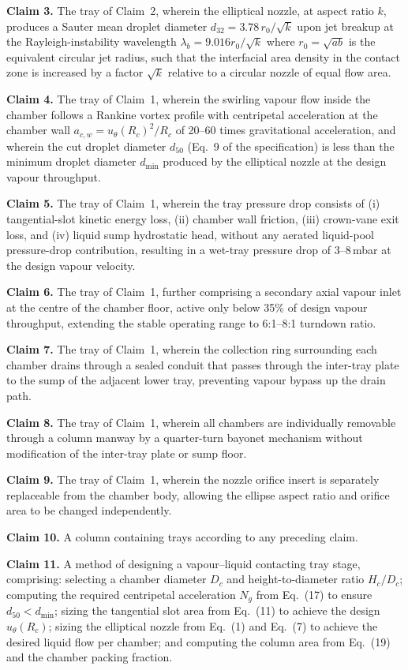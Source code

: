 \documentclass[11pt,letterpaper]{article}
\newcommand{\utheta}{u_{\theta}}
\newcommand{\Rc}{R_c}
\newcommand{\Hc}{H_c}
\newcommand{\Dc}{D_c}
\newcommand{\dsv}{d_{32}}
\newcommand{\dmin}{d_{\min}}
\newcommand{\dcut}{d_{50}}
\begin{document}
\textbf{Claim 3.}
The tray of Claim~2, wherein the elliptical nozzle, at aspect ratio $k$,
produces a Sauter mean droplet diameter $\dsv = 3.78\,r_0/\sqrt{k}$ upon
jet breakup at the Rayleigh-instability wavelength $\lambda_b = 9.016
r_0/\sqrt{k}$ where $r_0 = \sqrt{ab}$ is the equivalent circular jet
radius, such that the interfacial area density in the contact zone is
increased by a factor $\sqrt{k}$ relative to a circular nozzle of
equal flow area.

\textbf{Claim 4.}
The tray of Claim~1, wherein the swirling vapour flow inside the chamber
follows a Rankine vortex profile with centripetal acceleration at the
chamber wall $a_{c,w} = \utheta(\Rc)^2/\Rc$ of 20--60 times gravitational
acceleration, and wherein the cut droplet diameter $\dcut$ (Eq.~9 of the
specification) is less than the minimum droplet diameter $\dmin$ produced
by the elliptical nozzle at the design vapour throughput.

\textbf{Claim 5.}
The tray of Claim~1, wherein the tray pressure drop consists of
(i) tangential-slot kinetic energy loss, (ii) chamber wall friction,
(iii) crown-vane exit loss, and (iv) liquid sump hydrostatic head, without
any aerated liquid-pool pressure-drop contribution, resulting in a wet-tray
pressure drop of 3--8\,mbar at the design vapour velocity.

\textbf{Claim 6.}
The tray of Claim~1, further comprising a secondary axial vapour inlet at
the centre of the chamber floor, active only below 35\% of design vapour
throughput, extending the stable operating range to 6:1--8:1 turndown ratio.

\textbf{Claim 7.}
The tray of Claim~1, wherein the collection ring surrounding each chamber
drains through a sealed conduit that passes through the inter-tray plate to
the sump of the adjacent lower tray, preventing vapour bypass up the drain
path.

\textbf{Claim 8.}
The tray of Claim~1, wherein all chambers are individually removable through
a column manway by a quarter-turn bayonet mechanism without modification of
the inter-tray plate or sump floor.

\textbf{Claim 9.}
The tray of Claim~1, wherein the nozzle orifice insert is separately
replaceable from the chamber body, allowing the ellipse aspect ratio and
orifice area to be changed independently.

\textbf{Claim 10.}
A column containing trays according to any preceding claim.

\textbf{Claim 11.}
A method of designing a vapour--liquid contacting tray stage, comprising:
selecting a chamber diameter $\Dc$ and height-to-diameter ratio $\Hc/\Dc$;
computing the required centripetal acceleration $N_g$ from Eq.~(17) to
ensure $\dcut < \dmin$; sizing the tangential slot area from Eq.~(11) to
achieve the design $\utheta(\Rc)$; sizing the elliptical nozzle from
Eq.~(1) and Eq.~(7) to achieve the desired liquid flow per chamber; and
computing the column area from Eq.~(19) and the chamber packing fraction.
\end{document}
